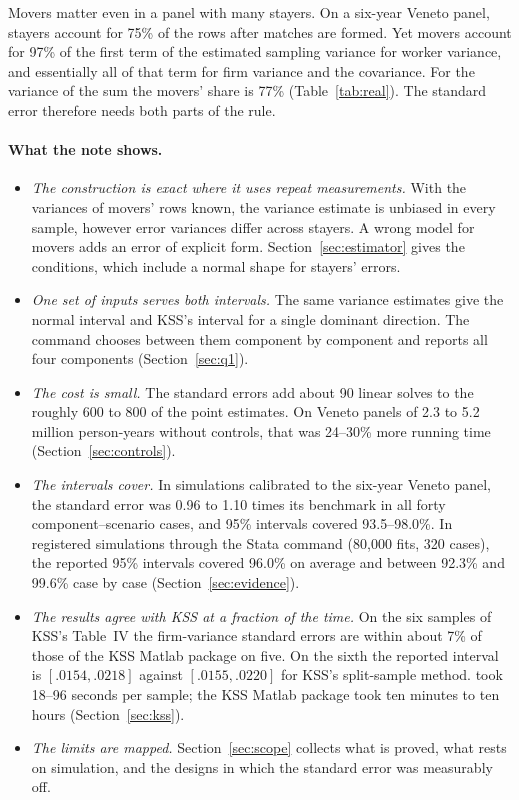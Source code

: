 Movers matter even in a panel with many stayers. On a six-year Veneto panel, stayers
account for 75\% of the rows after matches are formed. Yet movers account for 97\% of
the first term of the estimated sampling variance for worker variance, and essentially
all of that term for firm variance and the covariance. For the variance of the sum the
movers' share is 77\% (Table~\ref{tab:real}). The standard error therefore needs both
parts of the rule.

\paragraph{What the note shows.}
\begin{itemize}
\item \emph{The construction is exact where it uses repeat measurements.} With the
variances of movers' rows known, the variance estimate is unbiased in every sample,
however error variances differ across stayers. A wrong model for movers adds an error
of explicit form. Section~\ref{sec:estimator} gives the conditions, which include a
normal shape for stayers' errors.
\item \emph{One set of inputs serves both intervals.} The same variance estimates give
the normal interval and KSS's interval for a single dominant direction. The command
chooses between them component by component and reports all four components
(Section~\ref{sec:q1}).
\item \emph{The cost is small.} The standard errors add about 90 linear solves to the
roughly 600 to 800 of the point estimates. On Veneto panels of 2.3 to 5.2 million
person-years without controls, that was 24--30\% more running time
(Section~\ref{sec:controls}).
\item \emph{The intervals cover.} In simulations calibrated to the six-year Veneto
panel, the standard error was 0.96 to 1.10 times its benchmark in all forty
component--scenario cases, and 95\% intervals covered 93.5--98.0\%. In registered
simulations through the Stata command (80,000 fits, 320 cases), the reported 95\%
intervals covered 96.0\% on average and between 92.3\% and 99.6\% case by case
(Section~\ref{sec:evidence}).
\item \emph{The results agree with KSS at a fraction of the time.} On the six samples
of KSS's Table~IV the firm-variance standard errors are within about 7\% of those of
the KSS Matlab package on five. On the sixth the reported interval is $[.0154,.0218]$
against $[.0155,.0220]$ for KSS's split-sample method. \fevc{} took 18--96 seconds per
sample; the KSS Matlab package took ten minutes to ten hours (Section~\ref{sec:kss}).
\item \emph{The limits are mapped.} Section~\ref{sec:scope} collects what is proved,
what rests on simulation, and the designs in which the standard error was measurably
off.
\end{itemize}

